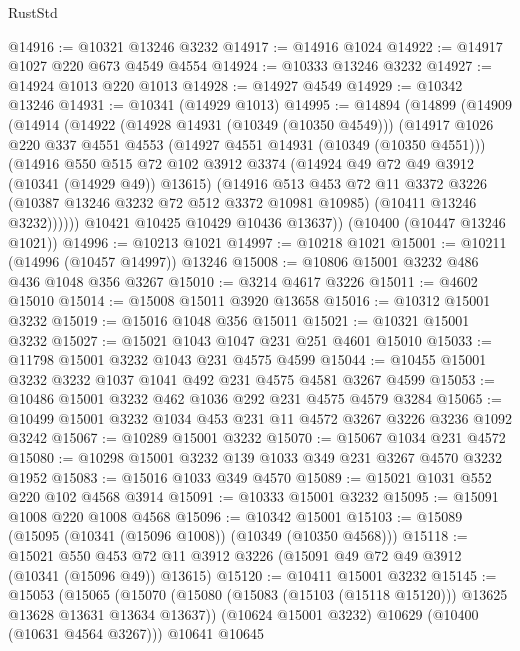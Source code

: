 \begin{lexlean}{RustStd}
\begin{coremodule}
@14916 := @10321 @13246 @3232
@14917 := @14916 @1024
@14922 := @14917 @1027 @220 @673 @4549 @4554
@14924 := @10333 @13246 @3232
@14927 := @14924 @1013 @220 @1013
@14928 := @14927 @4549
@14929 := @10342 @13246
@14931 := @10341 (@14929 @1013)
@14995 := @14894
    (@14899
      (@14909
        (@14914
          (@14922
            (@14928 @14931 (@10349 (@10350 @4549)))
            (@14917
              @1026
              @220
              @337
              @4551
              @4553
              (@14927 @4551 @14931 (@10349 (@10350 @4551)))
              (@14916
                @550
                @515
                @72
                @102
                @3912
                @3374
                (@14924 @49 @72 @49 @3912 (@10341 (@14929 @49)) @13615)
                (@14916
                  @513
                  @453
                  @72
                  @11
                  @3372
                  @3226
                  (@10387 @13246 @3232 @72 @512 @3372 @10981 @10985)
                  (@10411 @13246 @3232))))))
        @10421
        @10425
        @10429
        @10436
        @13637))
    (@10400 (@10447 @13246 @1021))
@14996 := @10213 @1021
@14997 := @10218 @1021
@15001 := @10211 (@14996 (@10457 @14997)) @13246
@15008 := @10806 @15001 @3232 @486 @436 @1048 @356 @3267
@15010 := @3214 @4617 @3226
@15011 := @4602 @15010
@15014 := @15008 @15011 @3920 @13658
@15016 := @10312 @15001 @3232
@15019 := @15016 @1048 @356 @15011
@15021 := @10321 @15001 @3232
@15027 := @15021 @1043 @1047 @231 @251 @4601 @15010
@15033 := @11798 @15001 @3232 @1043 @231 @4575 @4599
@15044 := @10455 @15001 @3232 @3232 @1037 @1041 @492 @231 @4575 @4581 @3267 @4599
@15053 := @10486 @15001 @3232 @462 @1036 @292 @231 @4575 @4579 @3284
@15065 := @10499 @15001 @3232 @1034 @453 @231 @11 @4572 @3267 @3226 @3236 @1092 @3242
@15067 := @10289 @15001 @3232
@15070 := @15067 @1034 @231 @4572
@15080 := @10298 @15001 @3232 @139 @1033 @349 @231 @3267 @4570 @3232 @1952
@15083 := @15016 @1033 @349 @4570
@15089 := @15021 @1031 @552 @220 @102 @4568 @3914
@15091 := @10333 @15001 @3232
@15095 := @15091 @1008 @220 @1008 @4568
@15096 := @10342 @15001
@15103 := @15089 (@15095 (@10341 (@15096 @1008)) (@10349 (@10350 @4568)))
@15118 := @15021
    @550
    @453
    @72
    @11
    @3912
    @3226
    (@15091 @49 @72 @49 @3912 (@10341 (@15096 @49)) @13615)
@15120 := @10411 @15001 @3232
@15145 := @15053
    (@15065
      (@15070 (@15080 (@15083 (@15103 (@15118 @15120))) @13625 @13628 @13631 @13634 @13637))
      (@10624 @15001 @3232)
      @10629
      (@10400 (@10631 @4564 @3267)))
    @10641
    @10645

\end{coremodule}
\end{lexlean}

